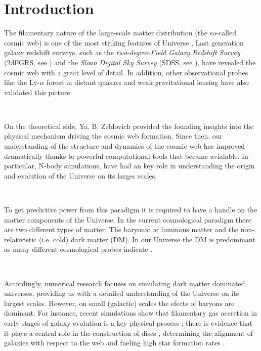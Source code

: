 \documentclass[a4,useAMS,usenatbib,usegraphicx,12pt]{article}
\begin{document}
\newpage

\section{Introduction}


The filamentary nature of the large-scale matter distribution (the so-called 
cosmic web) is one of the most striking features of Universe \citep{Bond96}, 
Last generation galaxy redshift surveys, such as the
\textit{two-degree-Field Galaxy  Redshift Survey} (2dFGRS, see
\citet{Colless03}) and the \textit{Sloan Digital  Sky Survey} (SDSS,
see \citet{Abazajian09}), have revealed the cosmic web with a great
level of detail. In addition, other observational probes like
the Ly-$\alpha$ forest in distant quasars \citep{Rauch98,
  Cantalupo14} and weak gravitational lensing 
\citep{Massey07, Dietrich12} have also validated this picture.

\

On the theoretical side, Ya. B. Zeldovich \citep{Zeldovich70} provided
the founding insights into the physical mechanism driving the cosmic
web formation. Since then, our understanding of the structure and
dynamics of the cosmic web  has improved dramatically thanks to
powerful computational tools that became avialable. In  particular,
N-body simulations,  have had an key role in understanding the origin
and evolution of the Universe on its larges scales.

\

To get predictive power from this paradigm it is required to have a
handle on the matter components of the Universe. In the current
cosmological paradigm there are two different types of matter. The
baryonic or luminous matter and the non-relativistic 
(i.e. cold) dark matter (DM). In our Universe the DM is predominant as
many different cosmological probes indicate \citep{Planck13XVI}. 

\

Accordingly, numerical research focuses on simulating dark matter
dominated universes, providing us with a detailed
understanding of the Universe on its largest scales. However, on small
(galactic) scales the efects of baryons are dominant. For instance,
recent simulations show that filamentary gas accretion in early stages
of galaxy evolution is a key physical process \citep{Dekel09}; there
is evidence that it plays a central role in the construction of discs
\citep{Dubois14}, determining the alignment of galaxies with respect
to the web \citep{Hahn10} and fueling high star formation rates
\citep{Dekel09}.  
\end{document}
